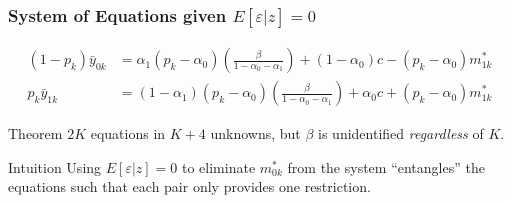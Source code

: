 \documentclass{beamer}
\begin{document}
%
\begin{frame}
  \frametitle{System of Equations given $E[\varepsilon|z]=0$}
  \small
  \alert{}
\begin{align*}
  (1 - p_k)\bar{y}_{0k} &=\alpha_1(p_k - \alpha_0)\left(\frac{\beta}{1 - \alpha_0 - \alpha_1}\right) + (1-\alpha_0)c - (p _k -  \alpha_0)m_{1k}^* \\[1.5ex]
  p_k\bar{y}_{1k} &=(1-\alpha_1)(p_k - \alpha_0)\left(\frac{\beta}{1 - \alpha_0 - \alpha_1}\right) + \alpha_0 c + (p _k -  \alpha_0)m_{1k}^*
\end{align*}

\begin{alertblock}{Theorem}
  $2K$ equations in $K+4$ unknowns, but $\beta$ is unidentified \emph{regardless} of $K$.
\end{alertblock}

\begin{block}{Intuition}
  Using $E[\varepsilon|z]=0$ to eliminate $m_{0k}^*$ from the system ``entangles'' the equations such that each pair only provides one restriction.
\end{block}

\end{frame}
\end{document}
